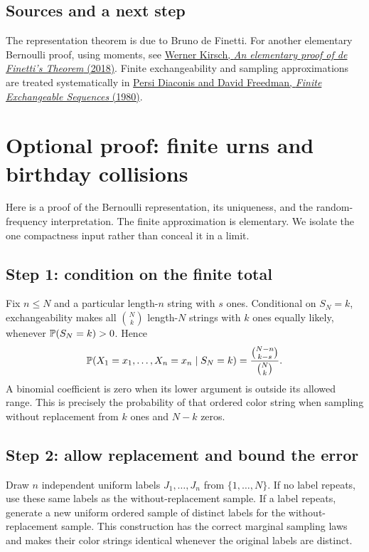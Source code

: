 \subsection*{Sources and a next step}
The representation theorem is due to Bruno de Finetti. For another elementary Bernoulli proof, using moments, see \href{https://arxiv.org/abs/1809.00882}{Werner Kirsch, \emph{An elementary proof of de Finetti's Theorem} (2018)}. Finite exchangeability and sampling approximations are treated systematically in \href{https://doi.org/10.1214/aop/1176994663}{Persi Diaconis and David Freedman, \emph{Finite Exchangeable Sequences} (1980)}.

\clearpage
\section{Optional proof: finite urns and birthday collisions}
\label{sec:df-proof}

Here is a proof of the Bernoulli representation, its uniqueness, and the random-frequency interpretation. The finite approximation is elementary. We isolate the one compactness input rather than conceal it in a limit.

\subsection*{Step 1: condition on the finite total}
Fix $n\le N$ and a particular length-$n$ string with $s$ ones. Conditional on $S_N=k$, exchangeability makes all $\binom Nk$ length-$N$ strings with $k$ ones equally likely, whenever $\P(S_N=k)>0$. Hence
\[
\P(X_1=x_1,\ldots,X_n=x_n\mid S_N=k)
=\frac{\binom{N-n}{k-s}}{\binom Nk}.
\]
A binomial coefficient is zero when its lower argument is outside its allowed range. This is precisely the probability of that ordered color string when sampling without replacement from $k$ ones and $N-k$ zeros.

\subsection*{Step 2: allow replacement and bound the error}
Draw $n$ independent uniform labels $J_1,\ldots,J_n$ from $\{1,\ldots,N\}$. If no label repeats, use these same labels as the without-replacement sample. If a label repeats, generate a new uniform ordered sample of distinct labels for the without-replacement sample. This construction has the correct marginal sampling laws and makes their color strings identical whenever the original labels are distinct.

